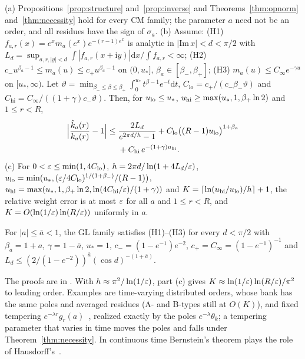\begin{theorem}[CM families]\label{thm:cm}
(a) Propositions~\ref{prop:structure} and~\ref{prop:inverse} and Theorems~\ref{thm:opnorm} and~\ref{thm:necessity} hold for every CM family; the parameter $a$ need not be an order, and all residues have the sign of $\sigma_a$.
(b) Assume: (H1) $f_{a,r}(x)=e^xm_a(e^x)e^{-(r-1)e^x}$ is analytic in $|\mathrm{Im}\,x|<d<\pi/2$ with $L_d=\sup_{a,r,|y|<d}\int|f_{a,r}(x+\mathrm iy)|\mathrm dx/\int f_{a,r}<\infty$; (H2) $c_-u^{\beta_a-1}\le m_a(u)\le c_+u^{\beta_a-1}$ on $(0,u_*]$, $\beta_a\in[\beta_-,\beta_+]$; (H3) $m_a(u)\le C_\infty e^{-\gamma u}$ on $[u_*,\infty)$. Let $\vartheta=\min_{\beta_-\le\beta\le\beta_+}\int_0^{u_*}t^{\beta-1}e^{-t}\mathrm dt$, $C_{\mathrm{lo}}=c_+/(c_-\beta_-\vartheta)$ and $C_{\mathrm{hi}}=C_\infty/((1+\gamma)c_-\vartheta)$. Then, for $u_{\mathrm{lo}}\le u_*$, $u_{\mathrm{hi}}\ge\max(u_*,1,\beta_+\ln2)$ and $1\le r<R$,
\begin{equation}
\begin{aligned}
\Big|\frac{\hat k_a(r)}{k_a(r)}-1\Big|\le{}&\frac{2L_d}{e^{2\pi d/h}-1}+C_{\mathrm{lo}}\big((R-1)u_{\mathrm{lo}}\big)^{1+\beta_a}\\
&+C_{\mathrm{hi}}\,e^{-(1+\gamma)u_{\mathrm{hi}}}.
\end{aligned}\label{eq:cmerr}
\end{equation}
(c) For $0<\varepsilon\le\min(1,4C_{\mathrm{lo}})$, $h=2\pi d/\ln(1+4L_d/\varepsilon)$, $u_{\mathrm{lo}}=\min(u_*,(\varepsilon/4C_{\mathrm{lo}})^{1/(1+\beta_-)}/(R-1))$, $u_{\mathrm{hi}}=\max(u_*,1,\beta_+\ln2,\ln(4C_{\mathrm{hi}}/\varepsilon)/(1+\gamma))$ and $K=\lceil\ln(u_{\mathrm{hi}}/u_{\mathrm{lo}})/h\rceil+1$, the relative weight error is at most $\varepsilon$ for all $a$ and $1\le r<R$, and $K=O(\ln(1/\varepsilon)\ln(R/\varepsilon))$ uniformly in $a$.
\end{theorem}

\begin{lemma}[GL constants]\label{lem:glconst}
For $|a|\le\bar a<1$, the GL family satisfies (H1)--(H3) for every $d<\pi/2$ with $\beta_a=1+a$, $\gamma=1-\bar a$, $u_*=1$, $c_-=(1-e^{-1})e^{-2}$, $c_+=C_\infty=(1-e^{-1})^{-1}$ and $L_d\le(2/(1-e^{-2}))^{\bar a}(\cos d)^{-(1+\bar a)}$.
\end{lemma}

The proofs are in . With $h\approx\pi^2/\ln(1/\varepsilon)$, part (c) gives $K\approx\ln(1/\varepsilon)\ln(R/\varepsilon)/\pi^2$ to leading order. Examples are time-varying distributed orders, whose bank has the same poles and averaged residues (A- and B-types still at $O(K)$), and fixed tempering $e^{-\lambda r}g_r(a)$~\cite{sabzikar2015}, realized exactly by the poles $e^{-\lambda}\theta_k$; a tempering parameter that varies in time moves the poles and falls under Theorem~\ref{thm:necessity}. In continuous time Bernstein's theorem plays the role of Hausdorff's~\cite{widder1941,mainardi2015}.

